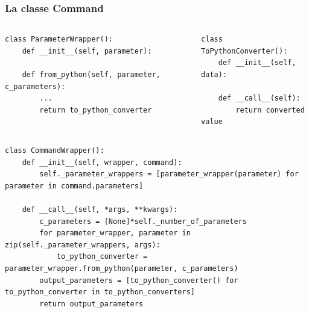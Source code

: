 \begin{frame}[fragile]
  \frametitle{La classe Command}
  {\tiny
    \begin{columns}
      \begin{column}{.5\textwidth}
\begin{verbatim}
class ParameterWrapper():
    def __init__(self, parameter):

    def from_python(self, parameter, c_parameters):
        ...
        return to_python_converter
\end{verbatim}
      \end{column}        
      \begin{column}{.5\textwidth}
\begin{verbatim}
class ToPythonConverter():
    def __init__(self, data):

    def __call__(self):
        return converted value
\end{verbatim}
    \end{column}
  \end{columns}
\begin{verbatim}
class CommandWrapper():
    def __init__(self, wrapper, command):
        self._parameter_wrappers = [parameter_wrapper(parameter) for parameter in command.parameters]

    def __call__(self, *args, **kwargs):
        c_parameters = [None]*self._number_of_parameters
        for parameter_wrapper, parameter in zip(self._parameter_wrappers, args):
            to_python_converter = parameter_wrapper.from_python(parameter, c_parameters)
        output_parameters = [to_python_converter() for to_python_converter in to_python_converters]
        return output_parameters
\end{verbatim}}
  \note{
    \begin{enumerate}
    \item 
    \end{enumerate}
  }
\end{frame}


